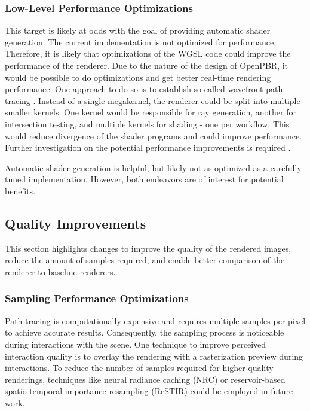 \subsubsection*{Low-Level Performance Optimizations}

This target is likely at odds with the goal of providing automatic shader generation. The current implementation is not optimized for performance. Therefore, it is likely that optimizations of the \gls{WGSL} code could improve the performance of the renderer. Due to the nature of the design of \gls{OpenPBR}, it would be possible to do optimizations and get better real-time rendering performance. One approach to do so is to establish so-called wavefront path tracing \cite{laine2013megakernels}. Instead of a single megakernel, the renderer could be split into multiple smaller kernels. One kernel would be responsible for ray generation, another for intersection testing, and multiple kernels for shading - one per workflow. This would reduce divergence of the shader programs and could improve performance. Further investigation on the potential performance improvements is required \cite{wavefrontComparisonInTableA5,mitsubaWavefrontVsMegakernel}.

Automatic shader generation is helpful, but likely not as optimized as a carefully tuned implementation. However, both endeavors are of interest for potential benefits.

\subsection*{Quality Improvements}

This section highlights changes to improve the quality of the rendered images, reduce the amount of samples required, and enable better comparison of the renderer to baseline renderers.

\subsubsection*{Sampling Performance Optimizations}

Path tracing is computationally expensive and requires multiple samples per pixel to achieve accurate results. Consequently, the sampling process is noticeable during interactions with the scene. One technique to improve perceived interaction quality is to overlay the rendering with a rasterization preview during interactions. To reduce the number of samples required for higher quality renderings, techniques like neural radiance caching (NRC) \cite{muller2021real} or reservoir-based spatio-temporal importance resampling (ReSTIR) \cite{restir} could be employed in future work.

